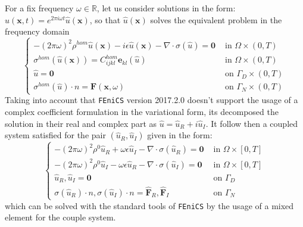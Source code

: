 For a fix frequency $\omega \in \mathbb{R}$, let us consider solutions in the form: $u(\mathbf{x},t) = e^{2 \pi i \omega t}\hat{u}(\mathbf{x})$, so that $\hat{u}(\mathbf{x})$ solves the equivalent problem in the frequency domain
\begin{equation*}
    \left \{
    \begin{array}{cc}
        -(2\pi \omega)^2 \rho^{hom} \hat{u}(\mathbf{x}) - i \epsilon \hat{u}(\mathbf{x}) - \nabla \cdot \sigma(\hat{u}) = \mathbf{0} & \text{ in } \Omega \times (0,T) \\
        \sigma^{hom}(\hat{u}(\mathbf{x}))  =  C_{ijkl}^{hom}\mathbf{e}_{kl}(\hat{u}) & \text{ in } \Omega \times (0,T)\\
        \hat{u} = \mathbf{0} & \text{ on } \Gamma_D\times (0,T)\\
        \sigma^{hom}(\hat{u}) \cdot n = \mathbf{F}(\mathbf{x}, \omega) & \text{ on }\Gamma_N \times (0,T)
    \end{array}
    \right .
\end{equation*}
Taking into account that \texttt{FEniCS} version 2017.2.0 doesn't support the usage of a complex coefficient formulation in the variational form, its decomposed the solution in their real and complex part as $\hat{u} = \hat{u}_R + i \hat{u}_I$. It follow then a coupled system satisfied for the pair $(\hat{u}_R, \hat{u}_I)$ given in the form:
\begin{equation*}
    \left \{
    \begin{array}{cc}
        -(2\pi \omega)^2 \rho^0 \hat{u}_R +  \omega \epsilon \hat{u}_I - \nabla \cdot \sigma (\hat{u}_R) = \mathbf{0} & \text{ in }\Omega \times [0,T] \\
        -(2\pi \omega)^2 \rho^0 \hat{u}_I - \omega \epsilon \hat{u}_R - \nabla \cdot \sigma (\hat{u}_I) = \mathbf{0} & \text{ in }\Omega \times [0, T] \\
        \hat{u}_R, \hat{u}_I = \mathbf{0} & \text{ on } \Gamma_D \\
        \sigma(\hat{u}_R)\cdot n, \sigma(\hat{u}_I)\cdot n = \hat{\mathbf{F}}_R, \hat{\mathbf{F}}_I & \text{ on }\Gamma_N
    \end{array}
    \right.
\end{equation*}
which can be solved with the standard tools of \texttt{FEniCS} by the usage of a mixed element for the couple system.

